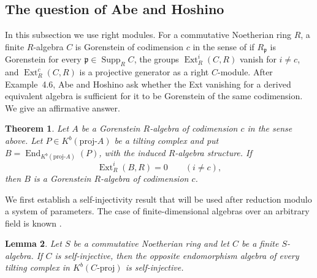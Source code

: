\documentclass[12pt,a4paper,english,reqno]{amsart}
\numberwithin{equation}{section}
\theoremstyle{plain}
\newtheorem{theorem}{Theorem}[section]
\newtheorem{lemma}[theorem]{Lemma}
\theoremstyle{definition}
\begin{document}
\subsection{The question of Abe and Hoshino}
\label{subsec:abe-hoshino-answer}

In this subsection we use right modules. For a commutative Noetherian
ring $R$, a finite $R$-algebra $C$ is Gorenstein of codimension $c$
in the sense of \cite[Definition~2.1]{AbeHoshino2009} if
$R_{\mathfrak p}$ is Gorenstein for every
$\mathfrak p\in\operatorname{Supp}_R C$, the groups
$\operatorname{Ext}^i_R(C,R)$ vanish for $i\ne c$, and
$\operatorname{Ext}^c_R(C,R)$ is a projective generator as a right
$C$-module. After Example~4.6, Abe and Hoshino ask whether the
Ext vanishing for a derived equivalent algebra is sufficient for
it to be Gorenstein of the same codimension. We give an affirmative
answer.

\begin{theorem}\label{thm:abe-hoshino-answer}
Let $A$ be a Gorenstein $R$-algebra of codimension $c$ in the sense
above. Let $P\in K^b(\mathrm{proj}\text{-}A)$ be a tilting complex and
put $B=\operatorname{End}_{K^b(\mathrm{proj}\text{-}A)}(P)$, with the
induced $R$-algebra structure. If
\[
 \operatorname{Ext}^i_R(B,R)=0\qquad(i\ne c),
\]
then $B$ is a Gorenstein $R$-algebra of codimension $c$.
\end{theorem}

We first establish a self-injectivity result that will be used after
reduction modulo a system of parameters. The case of
finite-dimensional algebras over an arbitrary field is known
\cite[Corollary~5.3]{XiZhangSelfInjective2025}.

\begin{lemma}\label{lem:artin-self-injective-base}
Let $S$ be a commutative Noetherian ring and let $C$ be a finite
$S$-algebra. If $C$ is self-injective, then the opposite endomorphism
algebra of every tilting complex in $K^b(C\text{-}\mathrm{proj})$
is self-injective.
\end{lemma}
\end{document}
